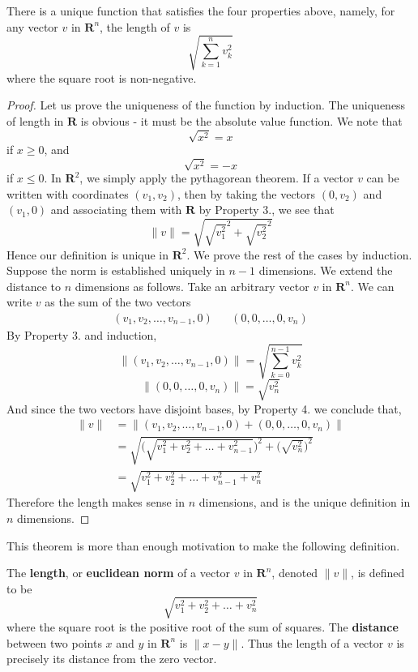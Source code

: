 \begin{theorem}
  There is a unique function that satisfies the four properties above, namely, for any vector $v$ in $\mathbf{R}^n$, the length of $v$ is
  \[ \sqrt{\sum_{k = 1}^n v_k^2} \]
  where the square root is non-negative.
\end{theorem}
\begin{proof}
  Let us prove the uniqueness of the function by induction. The uniqueness of length in $\mathbf{R}$ is obvious - it must be the absolute value function. We note that
  \[ \sqrt{x^2} = x \]
  if $x \geq 0$, and
  \[ \sqrt{x^2} = -x \]
  if $x \leq 0$. In $\mathbf{R}^2$, we simply apply the pythagorean theorem. If a vector $v$ can be written with coordinates $(v_1, v_2)$, then by taking the vectors $(0,v_2)$ and $(v_1,0)$ and associating them with $\mathbf{R}$ by Property 3., we see that
  \[ \|v\| = \sqrt{\sqrt{v_1^2}^2 + \sqrt{v_2^2}^2} \]
  Hence our definition is unique in $\mathbf{R}^2$. We prove the rest of the cases by induction. Suppose the norm is established uniquely in $n-1$ dimensions. We extend the distance to $n$ dimensions as follows. Take an arbitrary vector $v$ in $\mathbf{R}^n$. We can write $v$ as the sum of the two vectors
  \begin{align*}
    (v_1, v_2,\dots, v_{n-1}, 0) && (0, 0, \dots, 0, v_n)
  \end{align*}
  By Property 3. and induction,
  \[ \|(v_1, v_2, \dots, v_{n-1}, 0)\| = \sqrt{ \sum_{k = 0}^{n-1} v_k^2 } \]
  \[ \|(0,0,\dots,0,v_n)\| = \sqrt{v_n^2} \]
  And since the two vectors have disjoint bases, by Property 4. we conclude that,
  \begin{align*}
    \|v\| &= \| (v_1, v_2, \dots, v_{n-1}, 0) + (0,0,\dots,0,v_n) \|\\
      &= \sqrt{\bigg(\sqrt{v_1^2 + v_2^2 + \dots + v_{n-1}^2}\bigg)^2 + \bigg(\sqrt{v_n^2}\bigg)^2}\\
      &= \sqrt{v_1^2 + v_2^2 + \dots + v_{n-1}^2 + v_n^2}
  \end{align*}
  Therefore the length makes sense in $n$ dimensions, and is the unique definition in $n$ dimensions.
\end{proof}

This theorem is more than enough motivation to make the following definition.

\begin{definition}
  The {\bf length}, or {\bf euclidean norm} of a vector $v$ in $\mathbf{R}^n$, denoted $\|v\|$, is defined to be
  \[ \sqrt{v_1^2 + v_2^2 + \dots + v_n^2} \]
  where the square root is the positive root of the sum of squares. The {\bf distance} between two points $x$ and $y$ in $\mathbf{R}^n$ is $\| x - y \|$. Thus the length of a vector $v$ is precisely its distance from the zero vector.
\end{definition}

